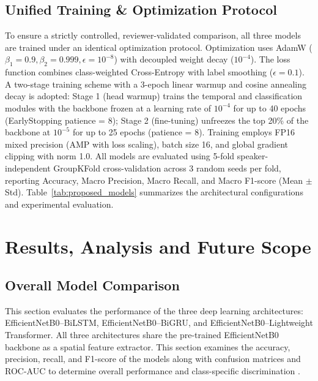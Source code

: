 \documentclass[journal]{IEEEtran}
\begin{document}
\subsection{Unified Training \& Optimization Protocol}
To ensure a strictly controlled, reviewer-validated comparison, all three models are trained under an identical optimization protocol. Optimization uses AdamW ($\beta_1 = 0.9, \beta_2 = 0.999, \epsilon = 10^{-8}$) with decoupled weight decay ($10^{-4}$). The loss function combines class-weighted Cross-Entropy with label smoothing ($\epsilon = 0.1$). A two-stage training scheme with a 3-epoch linear warmup and cosine annealing decay is adopted: Stage 1 (head warmup) trains the temporal and classification modules with the backbone frozen at a learning rate of $10^{-4}$ for up to 40 epochs (EarlyStopping patience = 8); Stage 2 (fine-tuning) unfreezes the top 20\% of the backbone at $10^{-5}$ for up to 25 epochs (patience = 8). Training employs FP16 mixed precision (AMP with loss scaling), batch size 16, and global gradient clipping with norm 1.0. All models are evaluated using 5-fold speaker-independent GroupKFold cross-validation across 3 random seeds per fold, reporting Accuracy, Macro Precision, Macro Recall, and Macro F1-score (Mean $\pm$ Std). Table~\ref{tab:proposed_models} summarizes the architectural configurations and experimental evaluation.









\section{Results, Analysis and Future Scope}

\subsection{Overall Model Comparison}

This section evaluates the performance of the three deep learning architectures: EfficientNetB0--BiLSTM, EfficientNetB0--BiGRU, and EfficientNetB0--Lightweight Transformer. All three architectures share the pre-trained EfficientNetB0 backbone as a spatial feature extractor. This section examines the accuracy, precision, recall, and F1-score of the models along with confusion matrices and ROC-AUC to determine overall performance and class-specific discrimination \cite{sokolova2009systematic,fawcett2006roc}.
\end{document}
